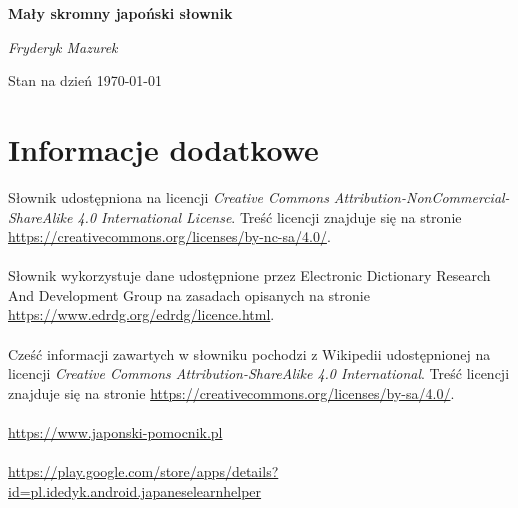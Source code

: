 \documentclass[10pt,a4paper,twoside,titlepage]{report} %
\begin{document}
\begin{titlepage}
	\centering
	\vspace*{6.5cm}
	{\huge\bfseries Mały skromny japoński słownik\par}
	\vspace{2cm}
	{\Large\itshape Fryderyk Mazurek\par}
	
	\vfill

	{\large Stan na dzień \today\par}
\end{titlepage}



\newpage
\section*{Informacje dodatkowe}
\markboth{}{}

\noindent Słownik udostępniona na licencji \textit{Creative Commons Attribution-NonCommercial-ShareAlike 4.0 International License}. Treść licencji znajduje się na stronie \url{https://creativecommons.org/licenses/by-nc-sa/4.0/}.\\ \\
\noindent Słownik wykorzystuje dane udostępnione przez Electronic Dictionary Research And Development Group na zasadach opisanych na stronie \url{https://www.edrdg.org/edrdg/licence.html}. \\ \\
\noindent Cześć informacji zawartych w słowniku pochodzi z Wikipedii udostępnionej na licencji \textit{Creative Commons Attribution-ShareAlike 4.0 International}. Treść licencji znajduje się na stronie \url{https://creativecommons.org/licenses/by-sa/4.0/}. \\ \\
\noindent \url{https://www.japonski-pomocnik.pl} \\ \\
\noindent \url{https://play.google.com/store/apps/details?id=pl.idedyk.android.japaneselearnhelper}

\end{document}
